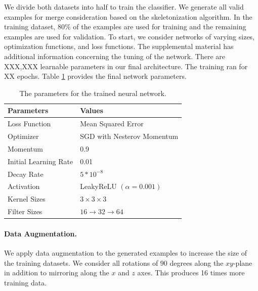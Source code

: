 We divide both datasets into half to train the classifier. We generate all valid examples for merge consideration based on the skeletonization algorithm. In the training dataset, $80\%$ of the examples are used for training and the remaining examples are used for validation. To start, we consider networks of varying sizes, optimization functions, and loss functions. The supplemental material has additional information concerning the tuning of the network. There are XXX,XXX learnable parameters in our final architecture. The training ran for XX epochs. Table \ref{table:architecture} provides the final network parameters.


\begin{table}[h!]
	\centering
	\begin{tabular}{l l} \hline
		\textbf{Parameters} & \textbf{Values} \\ \hline
		Loss Function & Mean Squared Error \\
		Optimizer & SGD  with Nesterov Momentum \\
		Momentum & 0.9 \\
		Initial Learning Rate & 0.01 \\
		Decay Rate & $5 * 10^{-8}$ \\
		Activation & LeakyReLU $(\alpha = 0.001)$ \\
		Kernel Sizes & $3 \times 3 \times 3$ \\
		Filter Sizes & $16 \to 32 \to 64$ \\ \hline
	\end{tabular}
	\caption{The parameters for the trained neural network.}
	\label{table:architecture}
\end{table}

\paragraph{Data Augmentation.}
We apply data augmentation to the generated examples to increase the size of the training datasets. 
We consider all rotations of $90$ degrees along the $xy$-plane in addition to mirroring along the $x$ and $z$ axes. 
This produces 16 times more training data. 

